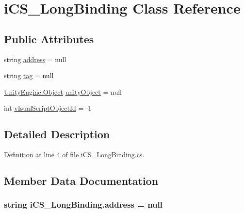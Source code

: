 \hypertarget{classi_c_s___long_binding}{\section{i\+C\+S\+\_\+\+Long\+Binding Class Reference}
\label{classi_c_s___long_binding}
}
\subsection*{Public Attributes}
\begin{DoxyCompactItemize}
\item 
string \hyperlink{classi_c_s___long_binding_a578d955d60a69af36bd4f4b81d76b9f7}{address} = null
\item 
string \hyperlink{classi_c_s___long_binding_abd24c5882b6351410c6d9fe16395a057}{tag} = null
\item 
\hyperlink{i_c_s___logic_8cs_a5b2c8b05b9a357906d7f9e5b2c1e154d}{Unity\+Engine.\+Object} \hyperlink{classi_c_s___long_binding_a91ad4e8b44b4616e60495fccc8ebe48e}{unity\+Object} = null
\item 
int \hyperlink{classi_c_s___long_binding_a16c03fb2846640fabbc010300d7bad61}{v\+Isual\+Script\+Object\+Id} = -\/1
\end{DoxyCompactItemize}


\subsection{Detailed Description}


Definition at line 4 of file i\+C\+S\+\_\+\+Long\+Binding.\+cs.



\subsection{Member Data Documentation}
\hypertarget{classi_c_s___long_binding_a578d955d60a69af36bd4f4b81d76b9f7}{
\subsubsection[{address}]{\setlength{\rightskip}{0pt plus 5cm}string i\+C\+S\+\_\+\+Long\+Binding.\+address = null}}\label{classi_c_s___long_binding_a578d955d60a69af36bd4f4b81d76b9f7}


